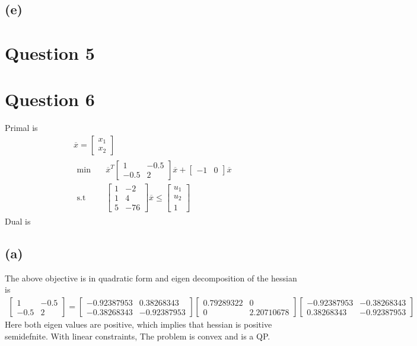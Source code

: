 \documentclass{article}
\begin{document}
\subsection*{(e)}

\section*{\hfil Question 5}
\section*{\hfil Question 6}
Primal is
\begin{gather*}
	\overline{x} = \begin{bmatrix}
	x_1 \\
	x_2 
	\end{bmatrix}\\
	\begin{aligned}
		\min \quad & \overline{x}^T\begin{bmatrix}
		1 & -0.5\\
		-0.5 & 2
		\end{bmatrix}\overline{x} + \begin{bmatrix}
		-1 & 0
		\end{bmatrix}\overline{x}\\
		\textrm{s.t} \quad & \begin{bmatrix}
		1 & -2\\
		1 & 4\\
		5 & -76
		\end{bmatrix}\overline{x} \le \begin{bmatrix}
		u_1\\
		u_2\\
		1
		\end{bmatrix}
	\end{aligned}
\end{gather*}
Dual is 
\subsection*{(a)}
The above objective is in quadratic form and eigen decomposition of the hessian is
\begin{gather*}
	\begin{bmatrix}
		1 & -0.5\\
		-0.5 & 2
	\end{bmatrix} = \begin{bmatrix}
		-0.92387953 & 0.38268343\\
		-0.38268343 & -0.92387953
		\end{bmatrix}\begin{bmatrix}
		0.79289322 & 0\\
		0 & 2.20710678
		\end{bmatrix}\begin{bmatrix}
		-0.92387953 & -0.38268343\\
		0.38268343 & -0.92387953
		\end{bmatrix}
\end{gather*}
Here both eigen values are positive, which implies that hessian is positive semidefnite. With linear constraints, The problem is convex and is a QP.
\end{document}
